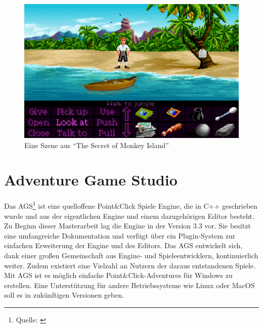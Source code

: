 \begin{figure}[h!]
\begin{center}
\includegraphics[scale=0.7]{images/monkeyIsland.png}
\caption{Eine Szene aus "`The Secret of Monkey Island"'}
\label{MonkeyIsland}
\end{center}
\end{figure}


\pagebreak
\section{Adventure Game Studio}
Das \ac{AGS}\footnote{Quelle: \cite{AGS2014}} 
ist eine quelloffene Point\&Click Spiele Engine, 
die in C++ geschrieben wurde und aus der eigentlichen Engine und einem dazugehörigen Editor besteht.
Zu Beginn dieser Masterarbeit lag die Engine in der Version 3.3 vor.
Sie besitzt eine umfangreiche Dokumentation und verfügt über ein Plugin-System zur einfachen Erweiterung der Engine und des Editors.
Das \acs{AGS} entwickelt sich, dank einer großen Gemeinschaft aus Engine- und Spieleentwicklern, kontinuierlich weiter.
Zudem existiert eine Vielzahl an Nutzern der daraus entstandenen Spiele.
Mit \acs{AGS} ist es möglich einfache Point\&Click-Adventures für Windows zu erstellen.
Eine Unterstützung für andere Betriebssysteme wie Linux oder MacOS soll es in zukünftigen Versionen geben.\\

